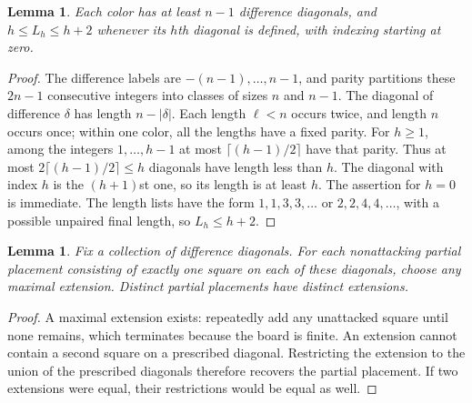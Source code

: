 \documentclass[11pt]{article}
\newtheorem{lemma}[theorem]{Lemma}
\begin{document}
\begin{lemma}\label{lem:length}
Each color has at least $n-1$ difference diagonals, and
$h\leq L_h\leq h+2$
whenever its $h$th diagonal is defined, with indexing starting at zero.
\end{lemma}
\begin{proof}
The difference labels are $-(n-1),\ldots,n-1$, and parity partitions
these $2n-1$ consecutive integers into classes of sizes $n$ and $n-1$.
The diagonal of difference $\delta$ has length $n-|\delta|$.
Each length $\ell<n$ occurs twice, and length $n$ occurs once;
within one color, all the lengths have a fixed parity.
For $h\geq1$, among the integers $1,\ldots,h-1$ at most
$\lceil(h-1)/2\rceil$ have that parity. Thus at most
$2\lceil(h-1)/2\rceil\leq h$ diagonals have length less than $h$.
The diagonal with index $h$ is the $(h+1)$st one, so its length is at
least $h$. The assertion for $h=0$ is immediate.
The length lists have the form $1,1,3,3,\ldots$ or
$2,2,4,4,\ldots$, with a possible unpaired final length, so
$L_h\leq h+2$.
\end{proof}

\begin{lemma}\label{lem:completion}
Fix a collection of difference diagonals. For each nonattacking partial
placement consisting of exactly one square on each of these diagonals, choose
any maximal extension. Distinct partial placements have distinct extensions.
\end{lemma}
\begin{proof}
A maximal extension exists: repeatedly add any unattacked square until none
remains, which terminates because the board is finite.
An extension cannot contain a second square on a prescribed diagonal.
Restricting the extension to the union of the prescribed diagonals therefore
recovers the partial placement. If two extensions were equal, their
restrictions would be equal as well.
\end{proof}
\end{document}
